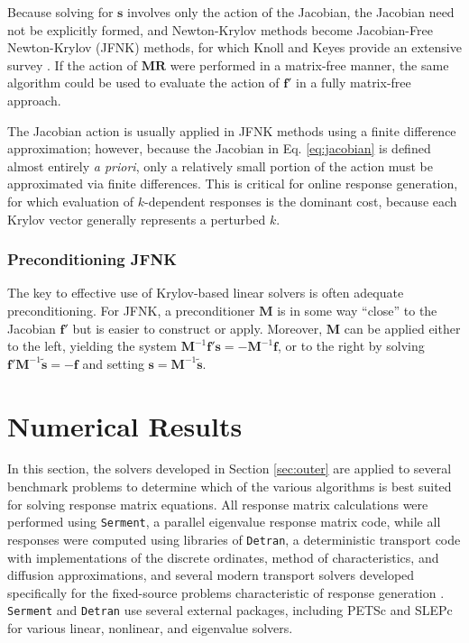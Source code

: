 Because solving for $\mathbf{s}$ involves only the action of the 
Jacobian, the Jacobian need not be explicitly formed, and
Newton-Krylov methods become Jacobian-Free Newton-Krylov (JFNK) 
methods, for which Knoll and Keyes provide an extensive survey 
\cite{knoll2004jfn}.  If the action of $\mathbf{MR}$ were performed 
in a matrix-free 
manner, the same algorithm could be used to evaluate the 
action of $\mathbf{f}'$ in a fully matrix-free approach.

The Jacobian action is usually applied in JFNK methods 
using a finite difference 
approximation; however, because the Jacobian in Eq. \ref{eq:jacobian} 
is defined almost entirely {\it a priori}, only a relatively small 
portion of the action must be approximated via finite differences.  
This is critical for online response generation, for which
evaluation of $k$-dependent responses is the dominant cost, because
each Krylov vector generally represents a perturbed $k$.

\subsubsection{Preconditioning JFNK}

The key to effective use of Krylov-based linear solvers is often 
adequate preconditioning.  For JFNK, a preconditioner $\mathbf{M}$ is 
in some way ``close'' to the Jacobian $\mathbf{f}'$ but is easier to 
construct or apply.  Moreover, $\mathbf{M}$ can be applied either 
to the left, yielding the 
system $\mathbf{M}^{-1}\mathbf{f}'\mathbf{s}=-\mathbf{M}^{-1}\mathbf{f}$, or 
to the right by solving 
$\mathbf{f}' \mathbf{M}^{-1} \tilde{\mathbf{s}} = -\mathbf{f}$ and 
setting $\mathbf{s} =  \mathbf{M}^{-1} \tilde{\mathbf{s}} $.

\section{Numerical Results}
\label{sec:results}


In this section, the solvers developed in 
Section \ref{sec:outer} are applied to several benchmark
problems to determine
which of the various algorithms is best suited for solving 
response matrix equations.  All response matrix calculations were performed 
using {\tt Serment}, a parallel eigenvalue response matrix code,
while all responses were computed using libraries of {\tt Detran}, a 
deterministic transport code with implementations of the 
discrete ordinates, method of 
characteristics, and diffusion approximations, and  
several modern transport solvers developed specifically 
for the fixed-source problems characteristic of 
response generation \cite{roberts2014dpm}.  {\tt Serment} 
and {\tt Detran} use several external packages, including 
PETSc \cite{petsc} and SLEPc \cite{slepc} for various linear, nonlinear,
and eigenvalue solvers.

